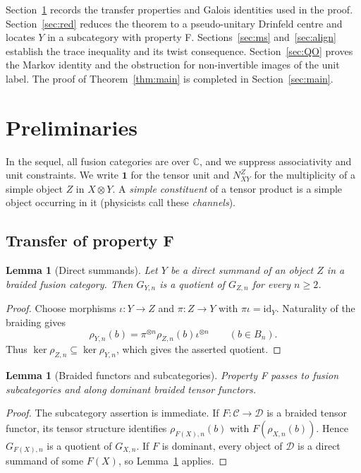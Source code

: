 \documentclass[11pt,oneside]{amsart}
\newtheorem{lemma}[theorem]{Lemma}
\theoremstyle{remark}
\newcommand{\C}{\mathcal C}
\newcommand{\D}{\mathcal D}
\newcommand{\one}{\mathbf 1}
\begin{document}
Section~\ref{sec:prelim} records the transfer properties and Galois identities
used in the proof. Section~\ref{sec:red} reduces the theorem to a pseudo-unitary
Drinfeld centre and locates $Y$ in a subcategory with property F.
Sections~\ref{sec:ms} and~\ref{sec:align} establish the trace inequality and its
twist consequence. Section~\ref{sec:QO} proves the Markov identity and the
obstruction for non-invertible images of the unit label. The proof of
Theorem~\ref{thm:main} is completed in Section~\ref{sec:main}.

\section{Preliminaries}\label{sec:prelim}

In the sequel, all fusion categories are over $\mathbb C$, and we suppress
associativity and unit constraints. We write $\one$ for the tensor unit and
$N_{XY}^Z$ for the multiplicity of a simple object $Z$ in $X\otimes Y$. A
\emph{simple constituent} of a tensor product is a simple object occurring in
it (physicists call these \emph{channels}).

\subsection{Transfer of property F}

\begin{lemma}[Direct summands]\label{lem:summands}
Let $Y$ be a direct summand of an object $Z$ in a braided fusion category.
Then $G_{Y,n}$ is a quotient of $G_{Z,n}$ for every $n\ge2$.
\end{lemma}

\begin{proof}
Choose morphisms $\iota:Y\to Z$ and $\pi:Z\to Y$ with
$\pi\iota=\mathrm{id}_Y$. Naturality of the braiding gives
\[
\rho_{Y,n}(b)=\pi^{\otimes n}\rho_{Z,n}(b)\iota^{\otimes n}
\qquad(b\in B_n).
\]
Thus $\ker\rho_{Z,n}\subseteq\ker\rho_{Y,n}$, which gives the asserted quotient.
\end{proof}

\begin{lemma}[Braided functors and subcategories]\label{lem:functors}
Property F passes to fusion subcategories and along dominant braided tensor
functors.
\end{lemma}

\begin{proof}
The subcategory assertion is immediate. If $F:\C\to\D$ is a braided tensor
functor, its tensor structure identifies $\rho_{F(X),n}(b)$ with
$F(\rho_{X,n}(b))$. Hence $G_{F(X),n}$ is a quotient of $G_{X,n}$. If $F$ is
dominant, every object of $\D$ is a direct summand of some $F(X)$, so
Lemma~\ref{lem:summands} applies.
\end{proof}
\end{document}
